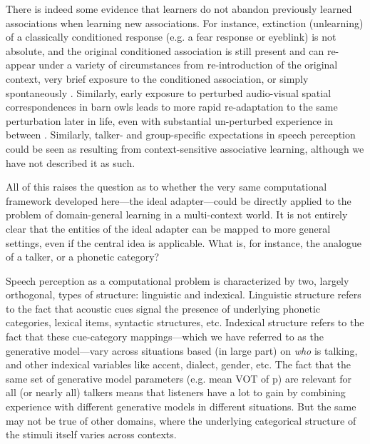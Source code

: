 There is indeed some evidence that learners do not abandon previously learned associations when learning new associations.  
For instance, extinction (unlearning) of a classically conditioned response (e.g. a fear response or eyeblink) is not absolute, and the original conditioned association is still present and can re-appear under a variety of circumstances from re-introduction of the original context, very brief exposure to the conditioned association, or simply spontaneously \autocite{Thanellou2011,Bouton1983,Sissons2009}.
Similarly, early exposure to perturbed audio-visual spatial correspondences in barn owls leads to more rapid re-adaptation to the same perturbation later in life, even with substantial un-perturbed experience in between \autocite{Kording2007a,Knudsen1998,Linkenhoker2005}.
Similarly, talker- and group-specific expectations in speech perception could be seen as resulting from  context-sensitive associative learning, although we have not described it as such.  

All of this raises the question as to whether the very same computational framework developed here---the ideal adapter---could be directly applied to the problem of domain-general learning in a multi-context world.  It is not entirely clear that the entities of the ideal adapter can be mapped to more general settings, even if the central idea is applicable.  What is, for instance, the analogue of a talker, or a phonetic category?

Speech perception as a computational problem is characterized by two, largely orthogonal, types of structure: linguistic and indexical.  Linguistic structure refers to the fact that acoustic cues signal the presence of underlying phonetic categories, lexical items, syntactic structures, etc.  Indexical structure refers to the fact that these cue-category mappings---which we have referred to as the generative model---vary across situations based (in large part) on \emph{who} is talking, and other indexical variables like accent, dialect, gender, etc.  The fact that the same set of generative model parameters (e.g. mean VOT of \ph p) are relevant for all (or nearly all) talkers means that listeners have a lot to gain by combining experience with different generative models in different situations.  But the same may not be true of other domains, where the underlying categorical structure of the stimuli itself varies across contexts.  

